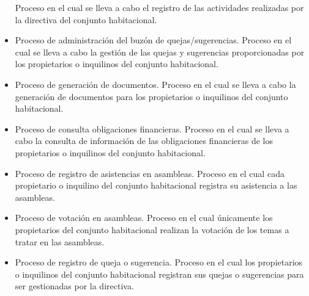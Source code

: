 \begin{itemize}
    Proceso en el cual se lleva a cabo el registro de las actividades realizadas por la directiva del conjunto habitacional.
    \item Proceso de administración del buzón de quejas/sugerencias.
    Proceso en el cual se lleva a cabo la gestión de las quejas y sugerencias proporcionadas por los propietarios o inquilinos del conjunto habitacional.
    \item Proceso de generación de documentos.
    Proceso en el cual se lleva a cabo la generación de documentos para los propietarios o inquilinos del conjunto habitacional.
    \item Proceso de consulta obligaciones financieras.
    Proceso en el cual se lleva a cabo la consulta de información de las obligaciones financieras de los propietarios o inquilinos del conjunto habitacional.
    \item Proceso de registro de asistencias en asambleas.
    Proceso en el cual cada propietario o inquilino del conjunto habitacional registra su asistencia a las asambleas.
    \item Proceso de votación en asambleas.
    Proceso en el cual únicamente los propietarios del conjunto habitacional realizan la votación de los temas a tratar en las asambleas.
    \item Proceso de registro de queja o sugerencia.
    Proceso en el cual los propietarios o inquilinos del conjunto habitacional registran sus quejas o sugerencias para ser gestionadas por la directiva.
\end{itemize}

